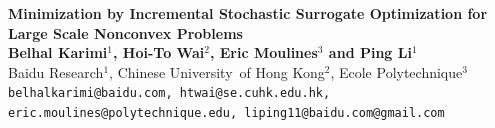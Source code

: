 \documentclass[a0,landscape]{a0poster}
\begin{document}

\begin{minipage}[b]{0.9\linewidth}
\veryHuge \color{Navy} \textbf{Minimization by Incremental Stochastic Surrogate Optimization for Large Scale Nonconvex Problems
}\\[1cm] \color{Black} %
\huge \textbf{Belhal Karimi$^{1}$, Hoi-To Wai$^{2}$, Eric Moulines$^{3}$ and Ping Li$^{1}$}\\[0.5cm] %
\huge Baidu Research$^1$, Chinese University~of Hong Kong$^2$, Ecole Polytechnique$^3$ \\[0.4cm] %
\large \texttt{belhalkarimi@baidu.com, htwai@se.cuhk.edu.hk, eric.moulines@polytechnique.edu, liping11@baidu.com@gmail.com}
\end{minipage}
%


\vspace{1cm} %

\end{document}
